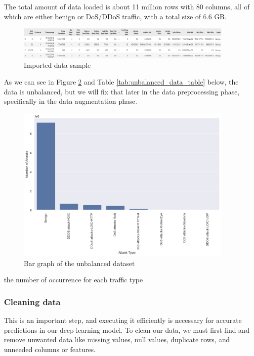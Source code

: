 

The total amount of data loaded is about 11 million rows with 80 columns, all of which are either benign or DoS/DDoS traffic, with a total size of 6.6 GB.

\newpage


\begin{figure}[h]
	\centering
	\includegraphics[width=400px]{figures/data_example.png}
	\caption{Imported data sample}
	\label{fig:datasample}
\end{figure}

As we can see in Figure \ref{fig:unbalanced_data} and Table \ref{tab:unbalanced_data_table} below, the data is unbalanced, but we will fix that later in the data preprocessing phase, specifically in the data augmentation phase.

\begin{figure}[h]
	\centering
	\includegraphics[width=400px]{figures/unbalanced_data.png}
	\caption{Bar graph of the unbalanced dataset}
	\label{fig:unbalanced_data}
\end{figure}

\begin{table}[h]
	\centering
	\caption{the number of occurrence for each traffic type}
	
	\label{tab:unbalanced_data_table} 
\end{table}

\newpage

\subsubsection{Cleaning data}
This is an important step, and executing it efficiently is necessary for accurate predictions in our deep learning model. To clean our data, we must first find and remove unwanted data like missing values, null values, duplicate rows, and unneeded columns or features.




